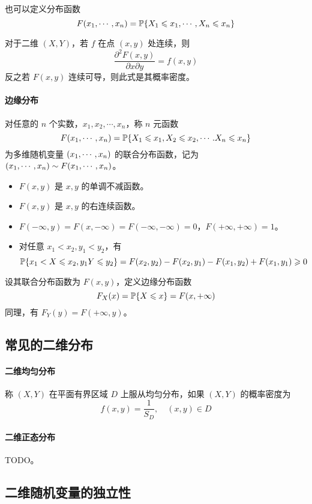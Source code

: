 也可以定义分布函数
\[ F(x_1,\cdots,x_n) = \mathbb{P}\{X_1 \leqslant x_1, \cdots, X_n \leqslant x_n \} \]

对于二维 $(X, Y)$，若 $f$ 在点 $(x, y)$ 处连续，则
\[ \frac{\partial^2 F(x, y)}{\partial x \partial y} = f(x, y) \]
反之若 $F(x, y)$ 连续可导，则此式是其概率密度。

\paragraph{边缘分布}

对任意的 $n$ 个实数，$x_1, x_2, \cdots, x_n$，称 $n$ 元函数
\[ F(x_1,\cdots,x_n) = \mathbb{P}\{X_1 \leqslant x_1, X_2 \leqslant x_2, \cdots. X_n \leqslant x_n\} \]
为多维随机变量 $(x_1,\cdots,x_n)$ 的联合分布函数，记为 $(x_1,\cdots,x_n) \sim F(x_1,\cdots,x_n)$。

\begin{itemize}
	\item $F(x, y)$ 是 $x, y$ 的单调不减函数。
	\item $F(x, y)$ 是 $x, y$ 的右连续函数。
	\item $F(-\infty, y) = F(x, -\infty) = F(-\infty, -\infty) = 0$，$F(+\infty, +\infty) = 1$。
	\item 对任意 $x_1 < x_2, y_1 < y_2$，有
	      \[ \mathbb{P}\{x_1 < X \leqslant x_2, y_1 Y \leqslant y_2\} = F(x_2, y_2) - F(x_2, y_1) - F(x_1, y_2) + F(x_1, y_1) \geqslant 0 \]
\end{itemize}

设其联合分布函数为 $F(x,y)$，定义边缘分布函数
\[ F_X(x) = \mathbb{P}\{X \leqslant x\} = F(x, +\infty) \]
同理，有 $F_Y(y) = F(+\infty, y)$。


\subsection{常见的二维分布}

\paragraph{二维均匀分布} 称 $(X,Y)$ 在平面有界区域 $D$ 上服从均匀分布，如果 $(X, Y)$ 的概率密度为
\[ f(x, y) = \frac{1}{S_D}, \quad (x, y) \in D \]

\paragraph{二维正态分布} TODO。

\subsection{二维随机变量的独立性}

